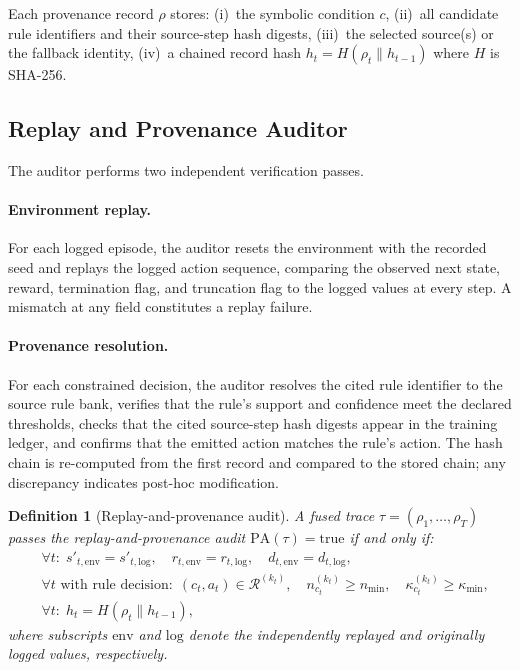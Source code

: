 \documentclass[12pt]{article}
\newtheorem{definition}{Definition}
\newcommand{\cR}{\mathcal{R}}       %
\newcommand{\PA}{\mathrm{PA}}       %
\begin{document}
Each provenance record $\rho$ stores:
(i)~the symbolic condition $c$,
(ii)~all candidate rule identifiers and their source-step hash digests,
(iii)~the selected source(s) or the fallback identity,
(iv)~a chained record hash $h_t = H(\rho_t \| h_{t-1})$ where $H$ is SHA-256.

\subsection{Replay and Provenance Auditor}
\label{sec:method:auditor}

The auditor performs two independent verification passes.

\paragraph{Environment replay.}
For each logged episode, the auditor resets the environment with the recorded
seed and replays the logged action sequence, comparing the observed next
state, reward, termination flag, and truncation flag to the logged values
at every step.
A mismatch at any field constitutes a replay failure.

\paragraph{Provenance resolution.}
For each constrained decision, the auditor resolves the cited rule identifier
to the source rule bank, verifies that the rule's support and confidence meet
the declared thresholds, checks that the cited source-step hash digests
appear in the training ledger, and confirms that the emitted action matches
the rule's action.
The hash chain is re-computed from the first record and compared to the
stored chain; any discrepancy indicates post-hoc modification.

\begin{definition}[Replay-and-provenance audit]
\label{def:audit}
A fused trace $\tau = (\rho_1, \ldots, \rho_T)$ passes the
replay-and-provenance audit $\PA(\tau) = \mathrm{true}$ if and only if:
\begin{align}
\label{eq:audit}
&\forall t:\; s'_{t,\mathrm{env}} = s'_{t,\mathrm{log}},\quad
  r_{t,\mathrm{env}} = r_{t,\mathrm{log}},\quad
  d_{t,\mathrm{env}} = d_{t,\mathrm{log}},\\
&\forall t \text{ with rule decision}:\;
  (c_t, a_t) \in \cR^{(k_t)},\quad
  n^{(k_t)}_{c_t} \ge n_{\min},\quad
  \kappa^{(k_t)}_{c_t} \ge \kappa_{\min},\nonumber\\
&\forall t:\; h_t = H(\rho_t \| h_{t-1}),\nonumber
\end{align}
where subscripts $\mathrm{env}$ and $\mathrm{log}$ denote the
independently replayed and originally logged values, respectively.
\end{definition}
\end{document}
